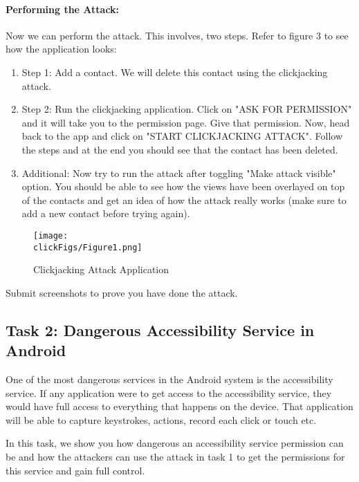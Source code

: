 \paragraph{Performing the Attack:} Now we can perform the attack. This
involves, two steps.  Refer to figure 3 to see how the application looks:

\begin{enumerate}
\item Step 1: Add a contact. We will delete this contact using the
clickjacking attack.

\item Step 2: Run the clickjacking application. Click on "ASK FOR
PERMISSION" and it will take you to the permission page. Give that
permission. Now, head back to the app and click on "START CLICKJACKING
ATTACK". Follow the steps and at the end you should see that the contact
has been deleted.  

\item Additional: Now try to run the attack after
toggling "Make attack visible" option. You should be able to see how the
views have been overlayed on top of the contacts and get an idea of how the
attack really works (make sure to add a new contact before trying again). 
\end{enumerate}

\begin{figure}[htb]
  \begin{center}
    \texttt{[image: \\clickFigs/Figure1.png]}
  \end{center}
  \caption{Clickjacking Attack Application}
\end{figure}

Submit screenshots to prove you have done the attack. 


\subsection{Task 2: Dangerous Accessibility Service in Android}

One of the most dangerous services in the Android system is the
accessibility service. If any application were to get access to the
accessibility service, they would have full access to everything that
happens on the device. That application will be able to capture keystrokes,
actions, record each click or touch etc. 

In this task, we show you how dangerous an accessibility service permission
can be and how the attackers can use the attack in task 1 to get the
permissions for this service and gain full control.

